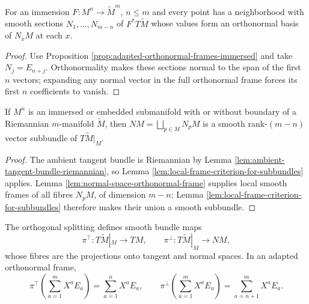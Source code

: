 \begin{lemma}
\label{lem:normal-space-orthonormal-frame}





For an immersion $F:M^n\to\widetilde M^m$, $n\le m$ and every point has a neighborhood with smooth sections $N_1,\ldots,N_{m-n}$ of $F^*T\widetilde M$ whose values form an orthonormal basis of $N_xM$ at each $x$.
\end{lemma}
\begin{proof}

\sketch Use Proposition \ref{prop:adapted-orthonormal-frames-immersed} and take $N_j=E_{n+j}$. Orthonormality makes these sections normal to the span of the first $n$ vectors; expanding any normal vector in the full orthonormal frame forces its first $n$ coefficients to vanish.
\end{proof}

\begin{proposition}
\label{prop:normal-bundle}





If $M^n$ is an immersed or embedded submanifold with or without boundary of a Riemannian $m$-manifold $\widetilde M$, then $NM=\bigsqcup_{p\in M}N_pM$ is a smooth rank-$(m-n)$ vector subbundle of $T\widetilde M|_M$.
\end{proposition}
\begin{proof}

\sketch The ambient tangent bundle is Riemannian by Lemma \ref{lem:ambient-tangent-bundle-riemannian}, so Lemma \ref{lem:local-frame-criterion-for-subbundles} applies. Lemma \ref{lem:normal-space-orthonormal-frame} supplies local smooth frames of all fibres $N_pM$, of dimension $m-n$; Lemma \ref{lem:local-frame-criterion-for-subbundles} therefore makes their union a smooth subbundle.
\end{proof}

\begin{remark}
\label{rem:normal-bundle-projections}

The orthogonal splitting defines smooth bundle maps
\[
\pi^\top:T\widetilde M|_M\to TM,\qquad \pi^\perp:T\widetilde M|_M\to NM,
\]
whose fibres are the projections onto tangent and normal spaces. In an adapted orthonormal frame,
\[
\pi^\top\!\left(\sum_{a=1}^mX^aE_a\right)=\sum_{a=1}^nX^aE_a,\qquad
\pi^\perp\!\left(\sum_{a=1}^mX^aE_a\right)=\sum_{a=n+1}^mX^aE_a.
\]
\end{remark}


